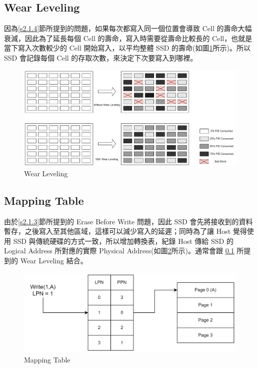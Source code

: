 \subsection{Wear Leveling}\label{s2.2.1}
\indent
因為\ref{s2.1.4}節所提到的問題，如果每次都寫入同一個位置會導致 Cell 的壽命大幅衰減，因此為了延長每個 Cell 的壽命，寫入時需要從壽命比較長的 Cell，也就是當下寫入次數較少的 Cell 開始寫入，以平均整體 SSD 的壽命(如圖\ref{f2.5}所示)。所以 SSD 會記錄每個 Cell 的存取次數，來決定下次要寫入到哪裡。\cite{Wear_Leveling_Thesis}
\begin{figure}[H]
    \centering
    \includegraphics[width=1\textwidth]{picture/ch2/Wear_Leveling.png}
    \caption{Wear Leveling\cite{Wear_Leveling_Pic}}
    \label{f2.5}
\end{figure}

\subsection{Mapping Table}\label{s2.2.2}
\indent
由於\ref{s2.1.3}節所提到的 Erase Before Write 問題，因此 SSD 會先將接收到的資料暫存，之後寫入至其他區域，這樣可以減少寫入的延遲；同時為了讓 Host 覺得使用 SSD 與傳統硬碟的方式一致，所以增加轉換表，紀錄 Host 傳給 SSD 的 Logical Address 所對應的實際 Physical Address(如圖\ref{f2.6}所示)。通常會跟 \ref{s2.2.1} 所提到的 Wear Leveling 結合。\cite{5496970}
\begin{figure}[H]
    \centering
    \includegraphics[width=1\textwidth]{picture/ch2/mapping_table.png}
    \caption{Mapping Table\cite{Mapping_Table}}
    \label{f2.6}
\end{figure}

